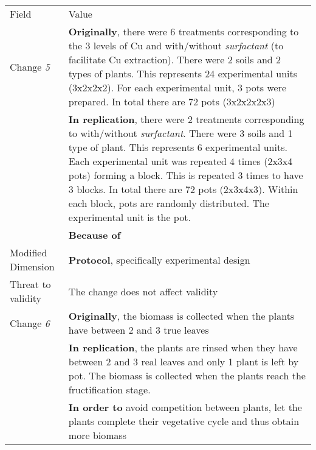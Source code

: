 \begin{table*}[h]
\label{tab:plantEng}
  \centering

\begin{tabularx}{\textwidth}{
  >{\hsize=0.25\hsize}X
  >{\hsize=0.8\hsize}X}
  
    \noalign{\smallskip}\hline\noalign{\smallskip}
  
  Field &  Value  \\ 
  \noalign{\smallskip}\hline\noalign{\smallskip}

    Change \textit{5}   & \textbf{Originally}, there were 6 treatments corresponding to the 3 levels of Cu and with/without \emph{surfactant} (to facilitate Cu extraction). There were 2 soils and 2 types of plants. This represents 24 experimental units (3x2x2x2). For each experimental unit, 3 pots were prepared. In total there are 72 pots (3x2x2x2x3) \\
    
    & \textbf{In replication}, there were 2 treatments corresponding to with/without \emph{surfactant}. There were 3 soils and 1 type of plant. This represents 6 experimental units. Each experimental unit was repeated 4 times (2x3x4 pots) forming a block. This is repeated 3 times to have 3 blocks. In total there are 72 pots (2x3x4x3). 
    Within each block, pots are randomly distributed. The experimental unit is the pot.
    \\& \textbf{Because of} 
    \\  
    Modified Dimension & 
    \textbf{Protocol}, specifically experimental design
    \\   
    Threat to validity  & The change does not affect validity  \\  
\hline
 Change \textit{6}   & \textbf{Originally}, the biomass is collected when the plants have between 2 and 3 true leaves \\& \textbf{In replication}, the plants are rinsed when they have between 2 and 3 real leaves and only 1 plant is left by pot. The biomass is collected when the plants reach the fructification stage. \\& \textbf{In order to}  avoid competition between plants, let the plants complete their vegetative cycle and thus obtain more biomass \\
    

\end{tabularx}
\end{table*}
